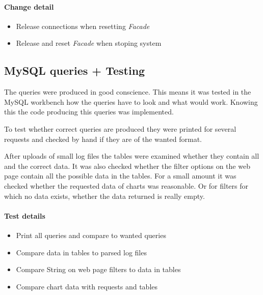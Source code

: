 \paragraph{Change detail} 
\begin{itemize}
  \item Release connections when resetting \textit{Facade}
   \item Release and reset \textit{Facade} when stoping system
\end{itemize}


\subsection{MySQL queries + Testing}
The queries were produced in good conscience. This means it was tested in the 
MySQL workbench how the queries have to look and what would work. Knowing this
the code producing this queries was implemented.

To test whether correct queries are produced they were printed for several requests
and checked by hand if they are of the wanted format.

After uploads of small log files the tables were examined whether they contain all
and the correct data. It was also checked whether the filter options on the web page
contain all the possible data in the tables. For a small amount it was checked
whether the requested data of charts was reasonable. Or for filters for which no 
data exists, whether the data returned is really empty.


\paragraph{Test details}
\begin{itemize}
  \item Print all queries and compare to wanted queries
  \item Compare data in tables to parsed log files
  \item Compare String on web page filters to data in tables 
  \item Compare chart data with requests and tables
\end{itemize}




